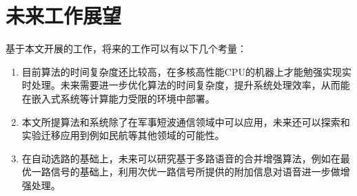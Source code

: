 \section{未来工作展望}

基于本文开展的工作，将来的工作可以有以下几个考量：

\begin{enumerate}
\item 目前算法的时间复杂度还比较高，在多核高性能CPU的机器上才能勉强实现实时处理。未来需要进一步优化算法的时间复杂度，提升系统处理效率，从而能在嵌入式系统等计算能力受限的环境中部署。
\item 本文所提算法和系统除了在军事短波通信领域中可以应用，未来还可以探索和实验迁移应用到例如民航等其他领域的可能性。
\item 在自动选路的基础上，未来可以研究基于多路语音的合并增强算法，例如在最优一路信号的基础上，利用次优一路信号所提供的附加信息对语音进一步做增强处理。
\end{enumerate}
